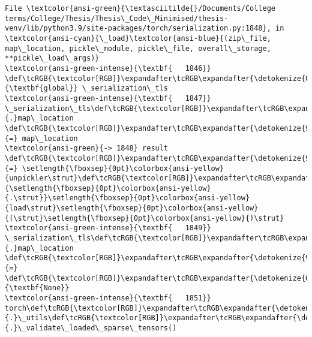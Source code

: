 \documentclass[11pt]{article}
\begin{document}
\begin{Verbatim}[commandchars=\\\{\}, frame=single, framerule=2mm, rulecolor=\color{outerrorbackground}]
File \textcolor{ansi-green}{\textasciitilde{}/Documents/College terms/College/Thesis/Thesis\_Code\_Minimised/thesis-venv/lib/python3.9/site-packages/torch/serialization.py:1848}, in \textcolor{ansi-cyan}{\_load}\textcolor{ansi-blue}{(zip\_file, map\_location, pickle\_module, pickle\_file, overall\_storage, **pickle\_load\_args)}
\textcolor{ansi-green-intense}{\textbf{   1846}} \def\tcRGB{\textcolor[RGB]}\expandafter\tcRGB\expandafter{\detokenize{0,135,0}}{\textbf{global}} \_serialization\_tls
\textcolor{ansi-green-intense}{\textbf{   1847}} \_serialization\_tls\def\tcRGB{\textcolor[RGB]}\expandafter\tcRGB\expandafter{\detokenize{98,98,98}}{.}map\_location \def\tcRGB{\textcolor[RGB]}\expandafter\tcRGB\expandafter{\detokenize{98,98,98}}{=} map\_location
\textcolor{ansi-green}{-> 1848} result \def\tcRGB{\textcolor[RGB]}\expandafter\tcRGB\expandafter{\detokenize{98,98,98}}{=} \setlength{\fboxsep}{0pt}\colorbox{ansi-yellow}{unpickler\strut}\def\tcRGB{\textcolor[RGB]}\expandafter\tcRGB\expandafter{\detokenize{98,98,98}}{\setlength{\fboxsep}{0pt}\colorbox{ansi-yellow}{.\strut}}\setlength{\fboxsep}{0pt}\colorbox{ansi-yellow}{load\strut}\setlength{\fboxsep}{0pt}\colorbox{ansi-yellow}{(\strut}\setlength{\fboxsep}{0pt}\colorbox{ansi-yellow}{)\strut}
\textcolor{ansi-green-intense}{\textbf{   1849}} \_serialization\_tls\def\tcRGB{\textcolor[RGB]}\expandafter\tcRGB\expandafter{\detokenize{98,98,98}}{.}map\_location \def\tcRGB{\textcolor[RGB]}\expandafter\tcRGB\expandafter{\detokenize{98,98,98}}{=} \def\tcRGB{\textcolor[RGB]}\expandafter\tcRGB\expandafter{\detokenize{0,135,0}}{\textbf{None}}
\textcolor{ansi-green-intense}{\textbf{   1851}} torch\def\tcRGB{\textcolor[RGB]}\expandafter\tcRGB\expandafter{\detokenize{98,98,98}}{.}\_utils\def\tcRGB{\textcolor[RGB]}\expandafter\tcRGB\expandafter{\detokenize{98,98,98}}{.}\_validate\_loaded\_sparse\_tensors()


\end{Verbatim}
\end{document}
